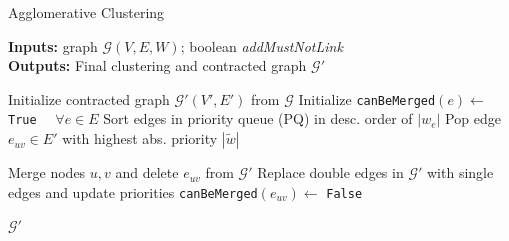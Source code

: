 \documentclass[10pt,twocolumn,letterpaper]{article}
\begin{document}
\begin{algorithm}
  \caption{Agglomerative Clustering}
   \hspace*{\algorithmicindent} \textbf{Inputs:} graph $\mathcal{G}(V,E,W)$; boolean {\color{blue}\emph{addMustNotLink}}  \\
  \hspace*{\algorithmicindent} \textbf{Outputs:} Final clustering and contracted graph $\mathcal{G}'$\\
  \hspace*{\algorithmicindent} 
  \begin{algorithmic}[1]


      \State Initialize contracted graph $\mathcal{G}'(V',E')$ from $\mathcal{G}$
      \State Initialize \texttt{canBeMerged}$(e) \gets$ \texttt{True} $\quad \forall e\in E$
      \State Sort edges in priority queue (PQ) in desc. order of $|w_e|$ 
      \State
        \State Pop edge $e_{uv}\in E'$ with highest abs. priority $|\tilde{w}|$
        \State
          
          
          \State Merge nodes $u,v$ and delete $e_{uv}$ from $\mathcal{G}'$
          \State  Replace double edges in $\mathcal{G}'$ with single edges
          \Statex \hspace{\algorithmicindent}\hspace{\algorithmicindent}\hspace{\algorithmicindent} and update priorities
        \EndIf
          \State \texttt{canBeMerged}$(e_{uv}) \gets$ \texttt{False}
        \EndIf
      \EndWhile


      \State
      \State
      \Return $\mathcal{G}'$



\end{algorithmic}
\end{algorithm}
\end{document}
